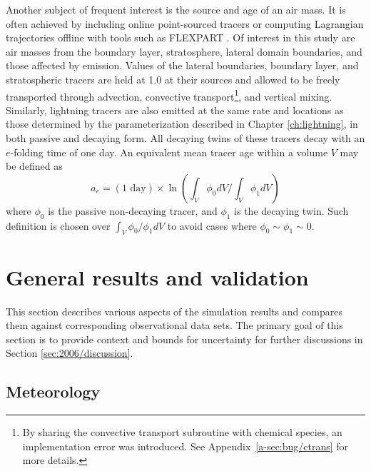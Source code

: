 	Another subject of frequent interest is the source and age of an air mass. It is often achieved by including online point-sourced tracers or computing Lagrangian trajectories offline with tools such as FLEXPART \citep{Stohl:2005vn}. Of interest in this study are air masses from the boundary layer, stratosphere, lateral domain boundaries, and those affected by {\lnox} emission. Values of the lateral boundaries, boundary layer, and stratospheric tracers are held at 1.0 at their sources and allowed to be freely transported through advection, convective transport\footnote{By sharing the convective transport subroutine with chemical species, an implementation error was introduced. See \mbox{Appendix}~\ref{a-sec:bug/ctrans} for more details.}, and vertical mixing. Similarly, lightning tracers are also emitted at the same rate and locations as those determined by the {\lnox} parameterization described in Chapter \ref{ch:lightning}, in both passive and decaying form. All decaying twins of these tracers decay with an $e$-folding time of one day. An equivalent mean tracer age within a volume $V$ may be defined as
	\begin{equation}\label{eqn:tracer-age}
		a_e = (\mbox {1 day})\times\ln\left(\int_V{\phi_0}dV/\int_V\phi_1dV\right)
	\end{equation}
	where $\phi_0$ is the passive non-decaying tracer, and $\phi_1$ is the decaying twin. Such definition is chosen over $\int_V\phi_0/\phi_1dV$ to avoid cases where $\phi_0\sim\phi_1\sim0$.

%
%
\section{General results and validation}\label{sec:2006/general}

This section describes various aspects of the simulation results and compares them against
corresponding observational data sets. The primary goal of this section is to provide context
and bounds for uncertainty for further discussions in Section \ref{sec:2006/discussion}.

\subsection{Meteorology}\label{ssec:2006/gen/met}

